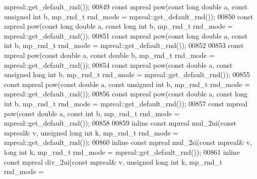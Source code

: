 \begin{DoxyCode}
      mpreal::get\_default\_rnd());
00849 \textcolor{keyword}{const} mpreal pow(\textcolor{keyword}{const} \textcolor{keywordtype}{long} \textcolor{keywordtype}{double} a, \textcolor{keyword}{const} \textcolor{keywordtype}{unsigned} \textcolor{keywordtype}{int} b, mp\_rnd\_t rnd\_mode = mpreal::get\_default\_rnd());
00850 \textcolor{keyword}{const} mpreal pow(\textcolor{keyword}{const} \textcolor{keywordtype}{long} \textcolor{keywordtype}{double} a, \textcolor{keyword}{const} \textcolor{keywordtype}{long} \textcolor{keywordtype}{int} b, mp\_rnd\_t rnd\_mode = mpreal::get\_default\_rnd());
00851 \textcolor{keyword}{const} mpreal pow(\textcolor{keyword}{const} \textcolor{keywordtype}{long} \textcolor{keywordtype}{double} a, \textcolor{keyword}{const} \textcolor{keywordtype}{int} b, mp\_rnd\_t rnd\_mode = mpreal::get\_default\_rnd());
00852 
00853 \textcolor{keyword}{const} mpreal pow(\textcolor{keyword}{const} \textcolor{keywordtype}{double} a, \textcolor{keyword}{const} \textcolor{keywordtype}{double} b, mp\_rnd\_t rnd\_mode = mpreal::get\_default\_rnd());
00854 \textcolor{keyword}{const} mpreal pow(\textcolor{keyword}{const} \textcolor{keywordtype}{double} a, \textcolor{keyword}{const} \textcolor{keywordtype}{unsigned} \textcolor{keywordtype}{long} \textcolor{keywordtype}{int} b, mp\_rnd\_t rnd\_mode = mpreal::get\_default\_rnd());
00855 \textcolor{keyword}{const} mpreal pow(\textcolor{keyword}{const} \textcolor{keywordtype}{double} a, \textcolor{keyword}{const} \textcolor{keywordtype}{unsigned} \textcolor{keywordtype}{int} b, mp\_rnd\_t rnd\_mode = mpreal::get\_default\_rnd());
00856 \textcolor{keyword}{const} mpreal pow(\textcolor{keyword}{const} \textcolor{keywordtype}{double} a, \textcolor{keyword}{const} \textcolor{keywordtype}{long} \textcolor{keywordtype}{int} b, mp\_rnd\_t rnd\_mode = mpreal::get\_default\_rnd());
00857 \textcolor{keyword}{const} mpreal pow(\textcolor{keyword}{const} \textcolor{keywordtype}{double} a, \textcolor{keyword}{const} \textcolor{keywordtype}{int} b, mp\_rnd\_t rnd\_mode = mpreal::get\_default\_rnd());
00858 
00859 \textcolor{keyword}{inline} \textcolor{keyword}{const} mpreal mul\_2ui(\textcolor{keyword}{const} mpreal& v, \textcolor{keywordtype}{unsigned} \textcolor{keywordtype}{long} \textcolor{keywordtype}{int} k, mp\_rnd\_t rnd\_mode = 
      mpreal::get\_default\_rnd());
00860 \textcolor{keyword}{inline} \textcolor{keyword}{const} mpreal mul\_2si(\textcolor{keyword}{const} mpreal& v, \textcolor{keywordtype}{long} \textcolor{keywordtype}{int} k, mp\_rnd\_t rnd\_mode = mpreal::get\_default\_rnd());
00861 \textcolor{keyword}{inline} \textcolor{keyword}{const} mpreal div\_2ui(\textcolor{keyword}{const} mpreal& v, \textcolor{keywordtype}{unsigned} \textcolor{keywordtype}{long} \textcolor{keywordtype}{int} k, mp\_rnd\_t rnd\_mode = 

\end{DoxyCode}
